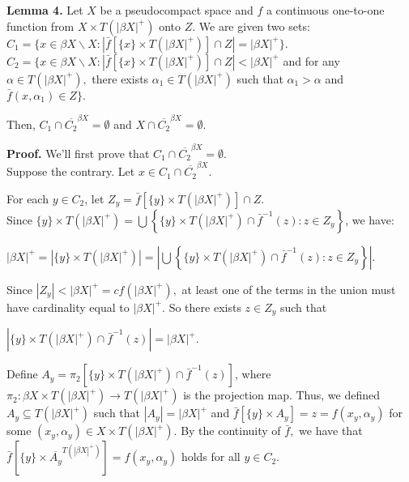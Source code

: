\documentclass{article}
\begin{document}
\textbf{Lemma 4.} Let $X$ be a pseudocompact space and $f$ a continuous one-to-one function from $X\times T(|\beta X|^+)$ onto $Z$. We are given two sets: \\
$C_1=\{x\in \beta X\backslash X: \left|\bar{f}[\{x\}\times T(|\beta X|^+)]\cap Z\right|=|\beta X|^+\}.$\\
$C_2=\{x\in \beta X\backslash X: \left|\bar{f}[\{x\}\times T(|\beta X|^+)]\cap Z\right|<|\beta X|^+ $ and for any $\alpha\in T(|\beta X|^+),$ there exists $\alpha_1\in T(|\beta X|^+)$ such that $\alpha_1 >\alpha$ and $\bar{f}(x,\alpha_1) \in Z \}.$

Then, $C_1\cap \overline{C_2}^{\beta X}=\emptyset$ and $X\cap \overline{C_2}^{\beta X}=\emptyset$.

\vskip 15pt

\textbf{Proof.} We'll first prove that $C_1\cap \overline{C_2}^{\beta X}=\emptyset$. \\
Suppose the contrary. Let $x\in C_1\cap \overline{C_2}^{\beta X}$. 

\vskip 10pt



For each $y\in C_2$, let $Z_y=\bar{f}\left[\{y\}\times T(|\beta X|^+)\right] \cap Z$. \\
Since $\{y\}\times T(|\beta X|^+) = \bigcup \left\{ \{y\} \times T(|\beta X|^+) \cap \bar{f}^{-1}(z):z\in Z_y \right\}$, we have:
\begin{center}
$\left|\beta X\right|^+ =\left| \{y\}\times T(|\beta X|^+)\right| = \left| \bigcup \left\{ \{y\} \times T(|\beta X|^+) \cap \bar{f}^{-1}(z):z\in Z_y \right\}\right|.$
\end{center}
 Since $\left|Z_y\right|<\left|\beta X\right|^+ = cf(\left|\beta X\right|^+),$ at least one of the terms in the union must have cardinality equal to $\left|\beta X\right|^+$. So there exists $z\in Z_y$ such that 
 
 $\left|  \{y\} \times T(|\beta X|^+) \cap \bar{f}^{-1}(z) \right|=\left|\beta X\right|^+$. 
 
 
Define $A_y=\pi_2 \left[ \{y\} \times T(|\beta X|^+) \cap \bar{f}^{-1}(z) \right]$, where $\pi_2: \beta X \times 
T(|\beta X|^+) \rightarrow T(|\beta X|^+)$ is the projection map. Thus, we defined $A_y\subseteq T(\left|\beta X\right|^+)$ such that $\left|A_y\right|=\left|\beta X\right|^+$ and $\bar{f}[\{y\}\times A_y]=z=f(x_y,\alpha_y)$ for some $(x_y, \alpha_y)\in X\times T(|\beta X|^+).$ By the continuity of $\bar{f},$ we have that $\bar{f}\left[\{y\}\times \overline{A_y}^{T(|\beta X|^+)}\right]=f(x_y,\alpha_y)$ holds for all $y \in C_2$.\\
\end{document}
